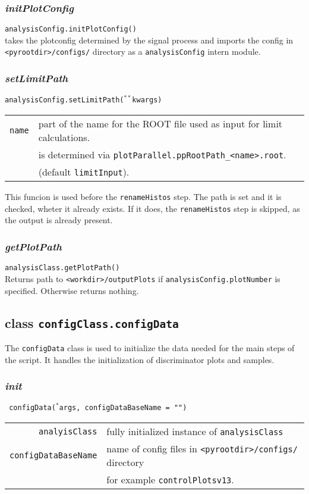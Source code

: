 \documentclass[12pt, a4paper]{article}
\newcommand{\args}{$^*$args}
\newcommand{\kwargs}{$^{**}$kwargs}
\begin{document}
\subsubsection{\textit{initPlotConfig}}
\texttt{analysisConfig.initPlotConfig()}\\
takes the plotconfig determined by the signal process and imports the config in \texttt{<pyrootdir>/configs/} directory as a \texttt{analysisConfig} intern module.

\subsubsection{\textit{setLimitPath}}
\texttt{analysisConfig.setLimitPath(\kwargs)}\\
\begin{tabular}{r|l}
\hline
\texttt{name}	&	part of the name for the ROOT file used as input for limit calculations.\\
				&	is determined via \texttt{plotParallel.ppRootPath\_<name>.root}.\\
				&	(default \texttt{limitInput}).\\
\hline
\end{tabular}
This funcion is used before the \texttt{renameHistos} step. The path is set and it is checked, wheter it already exists. If it does, the \texttt{renameHistos} step is skipped, as the output is already present.


\subsubsection{\textit{getPlotPath}}
\texttt{analysisClass.getPlotPath()}\\
Returns path to \texttt{<workdir>/outputPlots} if \texttt{analysisConfig.plotNumber} is specified. Otherwise returns nothing.


\subsection{class \texttt{configClass.configData}}
The \texttt{configData} class is used to initialize the data needed for the main steps of the script. It handles the initialization of discriminator plots and samples.

\subsubsection{\textit{init}}
\texttt{ configData(\args, configDataBaseName = "")}\\
\begin{tabular}{r|l}
\hline
\texttt{analyisClass} 		& fully initialized instance of \texttt{analysisClass} \\
\texttt{configDataBaseName}	& name of config files in \texttt{<pyrootdir>/configs/} directory \\
							& for example \texttt{controlPlotsv13}.\\
\hline
\end{tabular}
\end{document}
